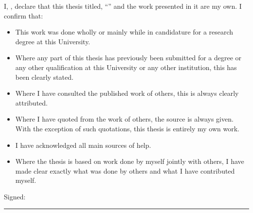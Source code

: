\documentclass[
11pt, %
english, %
singlespacing, %
headsepline, %
]{MastersDoctoralThesis} %
\begin{document}
\checktoopen




\begin{declaration}
\addchaptertocentry{\authorshipname} %
\noindent I, \authorname, declare that this thesis titled, \enquote{\ttitle} and the work presented in it are my own. I confirm that:

\begin{itemize} 
\item This work was done wholly or mainly while in candidature for a research degree at this University.
\item Where any part of this thesis has previously been submitted for a degree or any other qualification at this University or any other institution, this has been clearly stated.
\item Where I have consulted the published work of others, this is always clearly attributed.
\item Where I have quoted from the work of others, the source is always given. With the exception of such quotations, this thesis is entirely my own work.
\item I have acknowledged all main sources of help.
\item Where the thesis is based on work done by myself jointly with others, I have made clear exactly what was done by others and what I have contributed myself.\\
\end{itemize}
 
\noindent Signed:\\
\rule[0.5em]{25em}{0.5pt} %

\end{declaration}

\cleardoublepage

\end{document}
